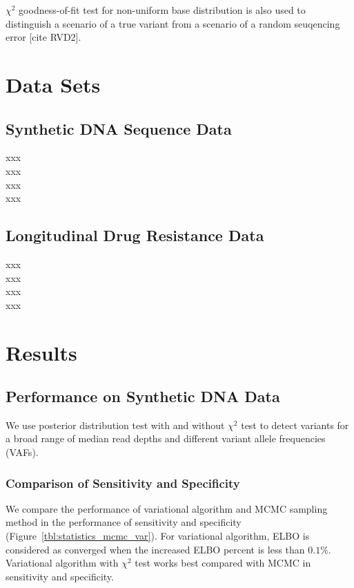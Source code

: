 \documentclass{article}
\begin{document}
$\chi^2$ goodness-of-fit test for non-uniform base distribution is also used to distinguish a scenario of a true variant from a scenario of a random seuqencing error [cite RVD2]. 


\section{Data Sets}
\subsection{Synthetic DNA Sequence Data}
xxx\\
xxx\\
xxx\\
xxx\\

\subsection{Longitudinal Drug Resistance Data}
xxx\\
xxx\\
xxx\\
xxx\\


\section{Results}
\subsection{Performance on Synthetic DNA Data}

We use posterior distribution test with and without $\chi^2$ test to detect variants for a broad range of median read depths and different variant allele frequencies (VAFs).
\subsubsection{Comparison of Sensitivity and Specificity}
We compare the performance of variational algorithm and MCMC sampling method in the performance of sensitivity and specificity (Figure~\ref{tbl:statistics_mcmc_var}).
For variational algorithm, ELBO is considered as converged when the increased ELBO percent is less than $0.1\%$.
Variational algorithm with $\chi^2$ test works best compared with MCMC in sensitivity and specificity.
\end{document}
